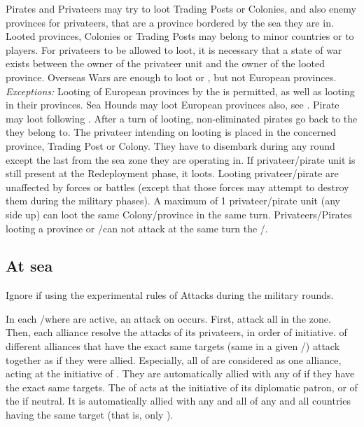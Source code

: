 \begin{todo}
 Pirates and Privateers may try to
loot Trading Posts or Colonies, and also enemy provinces for privateers, that
are a province bordered by the sea they are in.
\bparag Looted provinces, Colonies or Trading Posts may belong to minor
countries or to players. For privateers to be allowed to loot, it is necessary
that a state of war exists between the owner of the privateer unit and the
owner of the looted province. Overseas Wars are enough to loot \TP or \COL,
but not European provinces.
\bparag \textit{Exceptions:} Looting of European provinces by the
\Barbaresques is permitted, as well as looting in their provinces. Sea Hounds
may loot European provinces also, see .
\bparag Pirate may loot following . After a
turn of looting, non-eliminated pirates go back to the \STZ they belong to.
\bparag The privateer intending on looting is placed in the concerned
province, Trading Post or Colony. They have to disembark during any round
except the last from the sea zone they are operating in.
\bparag If privateer/pirate unit is still present at the Redeployment phase,
it loots. Looting privateer/pirate are unaffected by forces or battles (except
that those forces may attempt to destroy them during the military phases).
\bparag A maximum of 1 privateer/pirate unit (any side up) can loot the same
Colony/province in the same turn. Privateers/Pirates looting a province or
\COL/\TP can not attack at the same turn the \CTZ/\STZ.
\end{todo}

\subsection{At sea}
\begin{designnote}
  Ignore if using the experimental rules of Attacks during the military
  rounds.
\end{designnote}

 In each \STZ/\CTZ where
\corsaire are active, an attack on \TradeFLEET occurs.
\bparag First,  \corsaire attack all \TradeFLEET in the zone.
\bparag Then, each alliance resolve the attacks of its privateers, in order of
initiative.
\bparag \corsaire of different alliances that have the exact same targets
(same \TradeFLEET in a given \STZ/\CTZ) attack together as if they were
allied.
\bparag Especially, all \corsaire of \Barbaresques are considered as one
alliance, acting at the initiative of \TUR. They are automatically allied with
any \corsaire of \TUR if they have the exact same targets.
\bparag The \corsaire of \paysChevaliers acts at the initiative of its
diplomatic patron, or of the \SDCF if neutral. It is automatically allied with
any and all \corsaire of any and all countries having the same target (that
is, only \TUR).

